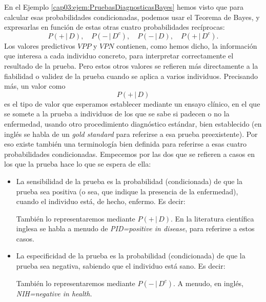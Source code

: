 En el Ejemplo \ref{cap03:ejem:PruebasDiagnosticasBayes} hemos visto que para calcular esas probabilidades condicionadas, podemos usar el Teorema de Bayes, y expresarlas en función de estas otras cuatro probabilidades recíprocas:
\[P(+\,|\,D),\quad P(-\,|\,D^c),\quad   P(-\,|\,D),\quad  P(+\,|\,D^c).\]
Los valores predictivos $VPP$ y $VPN$ contienen, como hemos dicho, la información que interesa a cada individuo concreto, para interpretar correctamente el resultado de la prueba. Pero estos otros valores se refieren más directamente a la fiabilidad o validez de la prueba cuando se aplica a varios individuos. Precisando más, un valor como
\[
P(+\,|\,D)
\]
es el tipo de valor que esperamos establecer mediante un ensayo clínico, en el que se somete a la
prueba a individuos de los que se sabe si padecen o no la enfermedad, usando otro procedimiento
diagnóstico estándar, bien establecido (en inglés se habla de un {\em gold standard} para referirse a esa prueba preexistente). Por eso existe también una terminología bien
definida para referirse a esas cuatro probabilidades condicionadas. Empecemos por las dos que se
refieren a casos en los que la prueba hace lo que se espera de ella:
 \begin{itemize}
    \item La {\sf sensibilidad} de la prueba es la probabilidad (condicionada) de que la prueba sea positiva (o sea, que indique la presencia de la enfermedad), cuando el individuo está, de hecho, enfermo. Es decir:

            \begin{center}
            \end{center}
        También lo representaremos mediante $P(+\,|\,D)$. En la literatura científica inglesa se habla a menudo de {\em PID=positive in disease}, para referirse a estos casos.

    \item La {\sf especificidad} de la prueba es la probabilidad (condicionada) de que la prueba sea negativa, sabiendo que el individuo está sano. Es decir:
            \begin{center}
            \end{center}
        También lo representaremos mediante $P(-\,|\,D^c)$. A menudo, en inglés, {\em NIH=negative in health.}
 \end{itemize}
